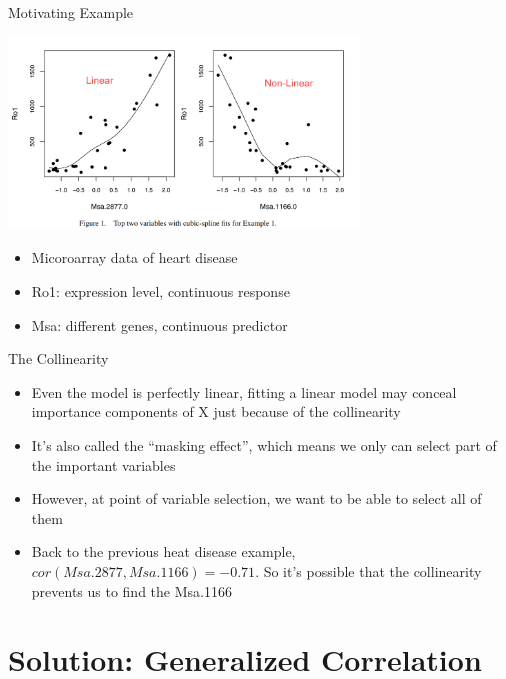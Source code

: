 \documentclass[ignorenonframetext,]{beamer}
\providecommand{\tightlist}{%
  \setlength{\itemsep}{0pt}\setlength{\parskip}{0pt}}
\begin{document}
\begin{frame}{Motivating Example}

\includegraphics[width=0.70000\textwidth]{./figure/overlooking.png}

\begin{itemize}
\tightlist
\item
  Micoroarray data of heart disease\\
\item
  Ro1: expression level, continuous response\\
\item
  Msa: different genes, continuous predictor
\end{itemize}

\end{frame}

\begin{frame}{The Collinearity}

\begin{itemize}
\tightlist
\item
  Even the model is perfectly linear, fitting a linear model may conceal
  importance components of X just because of the collinearity
\item
  It's also called the ``masking effect'', which means we only can
  select part of the important variables
\item
  However, at point of variable selection, we want to be able to select
  all of them
\item
  Back to the previous heat disease example,
  \(cor(Msa.2877, Msa.1166) = -0.71\). So it's possible that the
  collinearity prevents us to find the Msa.1166
\end{itemize}

\end{frame}

\section{Solution: Generalized
Correlation}\label{solution-generalized-correlation}
\end{document}
